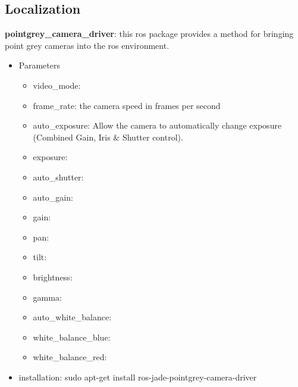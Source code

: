 \subsection{Localization}
\noindent \textbf{pointgrey\_camera\_driver}: this ros package provides a method for bringing point grey cameras into the ros environment. 

\begin{itemize}
\item Parameters
\begin{itemize}
\item video\_mode:
\item frame\_rate:  the camera speed in frames per second
\item auto\_exposure:  Allow the camera to automatically change exposure (Combined Gain, Iris \& Shutter control).
\item exposure: 
\item auto\_shutter:
\item auto\_gain:
\item gain:
\item pan:
\item tilt:
\item brightness:
\item gamma:
\item auto\_white\_balance:
\item white\_balance\_blue:
\item white\_balance\_red:
\end{itemize}
\item installation: sudo apt-get install ros-jade-pointgrey-camera-driver
\end{itemize}
